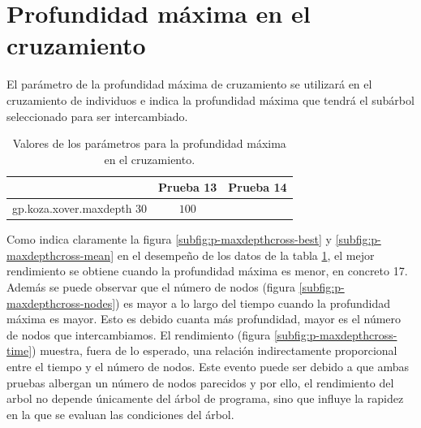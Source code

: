 \section{Profundidad máxima en el cruzamiento}\label{sec:p-prof-cross}

El parámetro de la profundidad máxima de cruzamiento se utilizará en el
cruzamiento de individuos e indica la profundidad máxima que tendrá el subárbol
seleccionado para ser intercambiado.

\begin{table}[tb]
\caption{Valores de los parámetros para la profundidad máxima en el
cruzamiento.}
\label{tab:prof-cross}
\centering
\begin{tabular}{lcc}
\toprule
  &\textbf{Prueba 13} & \textbf{Prueba 14}\\
\midrule
gp.koza.xover.maxdepth $30$ & $100$  \\
\bottomrule
\end{tabular}
\end{table}


Como indica claramente la figura \ref{subfig:p-maxdepthcross-best} y
\ref{subfig:p-maxdepthcross-mean} en el desempeño de los datos de la tabla
\ref{tab:prof-cross}, el mejor rendimiento se obtiene cuando la profundidad
máxima es menor, en concreto 17. Además se puede observar que el número de nodos
(figura \ref{subfig:p-maxdepthcross-nodes}) es mayor a lo largo del tiempo cuando
la profundidad máxima es mayor. Esto es debido cuanta más profundidad, mayor es
el número de nodos que intercambiamos. El rendimiento (figura
\ref{subfig:p-maxdepthcross-time}) muestra, fuera de lo esperado, una relación
indirectamente proporcional entre el tiempo y el número de nodos. Este evento
puede ser debido a que ambas pruebas albergan un número de nodos parecidos y
por ello, el rendimiento del arbol no depende únicamente del árbol de programa,
sino que influye la rapidez en la que se evaluan las condiciones del árbol. 


